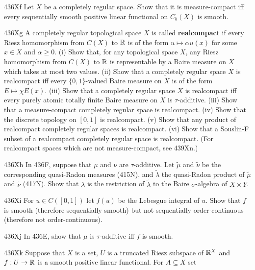 {\spheader 436Xf Let $X$ be a completely regular space.   Show that it is 
measure-compact iff every sequentially smooth positive linear functional 
on $C_b(X)$ is smooth.    
      
\spheader 436Xg A completely regular topological space 
$X$ is called {\bf realcompact} 
if every Riesz homomorphism from $C(X)$ to $\Bbb R$ is of the form 
$u\mapsto\alpha u(x)$ for some $x\in X$ and $\alpha\ge 0$.    
(i) Show that, for any topological space $X$, any Riesz 
homomorphism from $C(X)$ to $\Bbb R$ is representable by a Baire measure 
on $X$ which takes at most two values.  (ii) Show that 
a completely regular space $X$ is realcompact iff every $\{0,1\}$-valued 
Baire measure on $X$ is of the form $E\mapsto\chi E(x)$.   (iii) Show 
that a completely regular space $X$ is realcompact iff every purely 
atomic totally finite Baire measure on $X$ is $\tau$-additive.   (iii) 
Show that a measure-compact completely regular space is realcompact. 
(iv) Show that the discrete topology on $[0,1]$ is realcompact. 
   (v) Show that any product of 
realcompact completely regular spaces is realcompact.   (vi) Show that 
a Souslin-F subset of a realcompact completely regular space is 
realcompact.   (For realcompact spaces which are not measure-compact, 
see 439Xn.) 
      
\spheader 436Xh In 436F, suppose that $\mu$ and $\nu$ are 
$\tau$-additive.   Let $\tilde\mu$ and $\tilde\nu$ be the corresponding 
quasi-Radon measures (415N), and $\tilde\lambda$ the quasi-Radon product 
of $\tilde\mu$ and $\tilde\nu$ (417N).   Show that $\lambda$ is the 
restriction of $\tilde\lambda$ to the Baire $\sigma$-algebra of 
$X\times Y$. 
      
\sqheader 436Xi For $u\in C([0,1])$ let $f(u)$ be the Lebesgue integral 
of $u$.   Show that $f$ is smooth (therefore sequentially smooth) but 
not sequentially order-continuous (therefore not order-continuous). 
      
\spheader 436Xj In 436E, show that $\mu$ is $\tau$-additive iff $f$ is 
smooth. 
      
\spheader 436Xk Suppose that $X$ is a set, $U$ is a truncated Riesz 
subspace of $\Bbb R^X$ and $f:U\to\Bbb R$ is a smooth positive linear 
functional.   For $A\subseteq X$ set 
      
}
